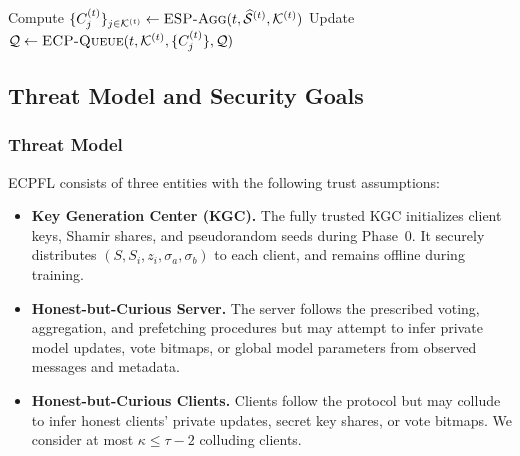 \begin{algorithm}[!t]
{ 
 Compute $\{C_j^{(t)}\}_{j \in \mathcal{K}^{(t)}} \leftarrow \textsc{ESP-Agg}(t, \widehat{\mathcal{S}}^{(t)}, \mathcal{K}^{(t)})$\;
 Update $\mathcal{Q} \leftarrow \textsc{ECP-Queue}(t, \mathcal{K}^{(t)}, \{C_j^{(t)}\}, \mathcal{Q})$\;
 }
\end{algorithm}
\endgroup

\subsection{Threat Model and Security Goals}
\label{sec:threat_model}
\subsubsection{Threat Model}
\textsc{ECPFL} consists of three entities with the following trust assumptions:
\begin{itemize}
\item \textbf{Key Generation Center (KGC).}
The fully trusted KGC initializes client keys, Shamir shares,
and pseudorandom seeds during Phase~0. It securely distributes
$(S,S_i,z_i,\sigma_a,\sigma_b)$ to each client, and remains offline during training.

\item \textbf{Honest-but-Curious Server.}
The server follows the prescribed voting, aggregation, and
prefetching procedures but may attempt to infer private
model updates, vote bitmaps, or global model parameters
from observed messages and metadata.

\item \textbf{Honest-but-Curious Clients.}
Clients follow the protocol but may collude to infer honest
clients' private updates, secret key shares, or vote bitmaps.
We consider at most $\kappa\le\tau-2$ colluding clients.
\end{itemize}

